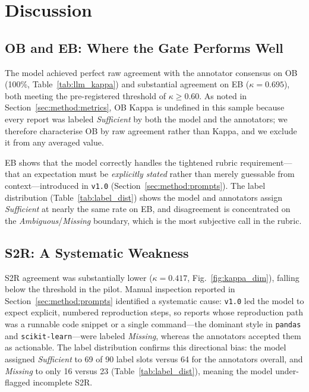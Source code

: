 
\section{Discussion}\label{sec:discussion}

\subsection{OB and EB: Where the Gate Performs Well}

The model achieved perfect raw agreement with the annotator consensus
on OB (100\%, Table~\ref{tab:llm_kappa}) and substantial agreement on
EB ($\kappa = 0.695$), both meeting the pre-registered threshold of
$\kappa \geq 0.60$.  As noted in Section~\ref{sec:method:metrics},
OB Kappa is undefined in this sample because every report was labeled
\textit{Sufficient} by both the model and the annotators; we therefore
characterise OB by raw agreement rather than Kappa, and we exclude it
from any averaged value.

EB shows that the model correctly handles the tightened rubric
requirement---that an expectation must be \emph{explicitly stated}
rather than merely guessable from context---introduced in
\texttt{v1.0} (Section~\ref{sec:method:prompts}).  The label
distribution (Table~\ref{tab:label_dist}) shows the model and
annotators assign \textit{Sufficient} at nearly the same rate on EB,
and disagreement is concentrated on the \textit{Ambiguous}/\textit{Missing}
boundary, which is the most subjective call in the rubric.

\subsection{S2R: A Systematic Weakness}

S2R agreement was substantially lower ($\kappa = 0.417$,
Fig.~\ref{fig:kappa_dim}), falling below the threshold in the pilot.
Manual inspection reported in Section~\ref{sec:method:prompts}
identified a systematic cause: \texttt{v1.0} led the model to expect
explicit, numbered reproduction steps, so reports whose reproduction
path was a runnable code snippet or a single command---the dominant
style in \texttt{pandas} and \texttt{scikit-learn}---were labeled
\textit{Missing}, whereas the annotators accepted them as actionable.
The label distribution confirms this directional bias: the model
assigned \textit{Sufficient} to 69 of 90 label slots versus 64 for the
annotators overall, and \textit{Missing} to only 16 versus 23
(Table~\ref{tab:label_dist}), meaning the model under-flagged
incomplete S2R.

